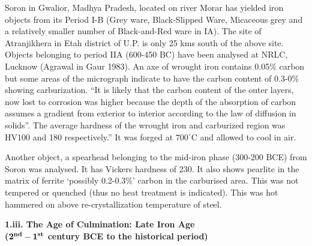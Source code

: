 Soron in Gwalior, Madhya Pradesh, located on river Morar has yielded iron objects from its Period I-B (Grey ware, Black-Slipped Ware, Micaceous grey and a relatively smaller number of Black-and-Red ware in IA). The site of Atranjikhera in Etah district of U.P. is only 25 kms south of the above site. Objects belonging to period IIA (600-450 BC) have been analysed at NRLC, Lucknow (Agrawal in Gaur 1983). An axe of wrought iron contains 0.05\% carbon but some areas of the micrograph indicate to have the carbon content of 0.3-0\% showing carburization. “It is likely that the carbon content of the outer layers, now lost to corrosion was higher because the depth of the absorption of carbon assumes a gradient from exterior to interior according to the law of diffusion in solids”. The average hardness of the wrought iron and carburized region was HV100 and 180 respectively.” It was forged at $700^\circ$C and allowed to cool in air. 


Another object, a spearhead belonging to the mid-iron phase (300-200 BCE) from Soron was analysed. It has Vickers hardness of 230. It also shows pearlite in the matrix of ferrite ‘possibly 0.2-0.3\%’ carbon in the carburised area. This was not tempered or quenched (thus no heat treatment is indicated). This was hot hammered on above re-crystallization temperature of steel. 

\vspace{.3cm}

\textbf{\large 1.iii. The Age of Culmination: Late Iron Age\\ ($\mathbf{2^{\rm \bf nd} -1^{\rm \bf st}}$ century BCE to the historical period)}

